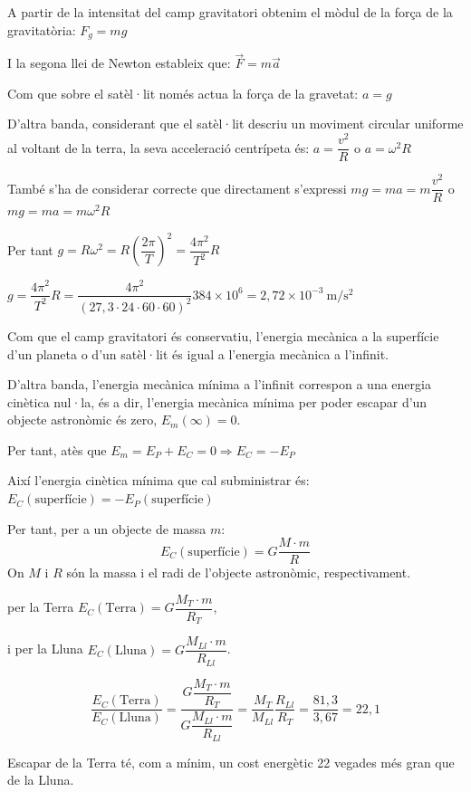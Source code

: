 \begin{solapartat}
 A partir de la intensitat del camp gravitatori obtenim el mòdul de la força de la gravitatòria: $F_g = mg$

 I la segona llei de Newton estableix que: $\vec{F} = m\vec{a}$

 Com que sobre el satèl·lit només actua la força de la gravetat: $a = g$

 D'altra banda, considerant que el satèl·lit descriu un moviment circular uniforme al voltant de la terra, la seva acceleració centrípeta és: $a = \dfrac{v^2}{R}$ o $a = \omega^2 R$

També s'ha de considerar correcte que directament s'expressi $mg = ma = m\dfrac{v^2}{R}$ o $mg = ma = m\omega^2 R$

 Per tant $g = R\omega^2 = R\left(\dfrac{2\pi}{T}\right)^2 = \dfrac{4\pi^2}{T^2}R$

 $g = \dfrac{4\pi^2}{T^2}R = \dfrac{4\pi^2}{(27,3\cdot 24\cdot 60\cdot 60)^2}384\times 10^{6} = 2,72\times 10^{-3}\ \mathrm{m/s^2}$
\end{solapartat}

\begin{solapartat}
 Com que el camp gravitatori és conservatiu, l'energia mecànica a la superfície d'un planeta o d'un satèl·lit és igual a l'energia mecànica a l'infinit.

 D'altra banda, l'energia mecànica mínima a l'infinit correspon a una energia cinètica nul·la, és a dir, l'energia mecànica mínima per poder escapar d'un objecte astronòmic és zero, $E_m(\infty) = 0$.

 Per tant, atès que $E_m = E_P + E_C = 0 \Rightarrow E_C = -E_P$

Així l'energia cinètica mínima que cal subministrar és: $E_C(\text{superfície}) = -E_P(\text{superfície})$

 Per tant, per a un objecte de massa $m$:
\[ E_C(\text{superfície}) = G\frac{M\cdot m}{R} \]
On $M$ i $R$ són la massa i el radi de l'objecte astronòmic, respectivament.

 per la Terra \quad $E_C(\text{Terra}) = G\dfrac{M_T\cdot m}{R_T}$,

i per la Lluna \quad $E_C(\text{Lluna}) = G\dfrac{M_{Ll}\cdot m}{R_{Ll}}$.

\[ \frac{E_C(\text{Terra})}{E_C(\text{Lluna})} = \frac{G\dfrac{M_T\cdot m}{R_T}}{G\dfrac{M_{Ll}\cdot m}{R_{Ll}}} = \frac{M_T}{M_{Ll}}\frac{R_{Ll}}{R_T} = \frac{81,3}{3,67} = 22,1 \]

Escapar de la Terra té, com a mínim, un cost energètic 22 vegades més gran que de la Lluna.
\end{solapartat}
